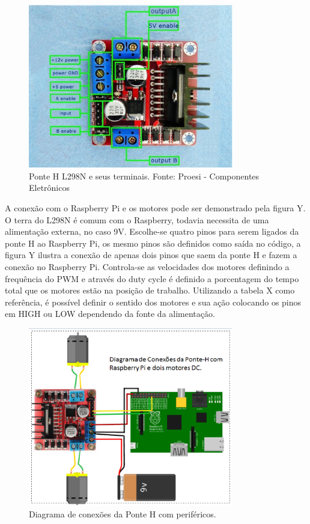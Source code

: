 \begin{figure}[H]
    \centering
    \includegraphics[width=0.8\textwidth]{figuras/ponteH.eps}
    \caption{Ponte H L298N e seus terminais. Fonte: Proesi - Componentes Eletrônicos}
    \label{fig:catia01}
\end{figure}

A conexão com o Raspberry Pi e os motores pode ser demonstrado pela figura Y. O terra do L298N é comum com o Raspberry, todavia necessita de uma alimentação externa, no caso 9V. Escolhe-se quatro pinos para serem ligados da ponte H ao Raspberry Pi, os mesmo pinos são definidos como saída no código, a figura Y ilustra a conexão de apenas dois pinos que saem da ponte H e fazem a conexão no Raspberry Pi. Controla-se as velocidades dos motores definindo a frequência do PWM e através do duty cycle é definido a porcentagem do tempo total que os motores estão na posição de trabalho. Utilizando a tabela X como referência, é possível definir o sentido dos motores e sua ação colocando os pinos em HIGH ou LOW  dependendo da fonte da alimentação. 

\begin{figure}[H]
    \centering
    \includegraphics[width=0.8\textwidth]{figuras/esquematico_componentes.eps}
    \caption{Diagrama de conexões da Ponte H com periféricos.}
    \label{fig:catia01}
\end{figure}

